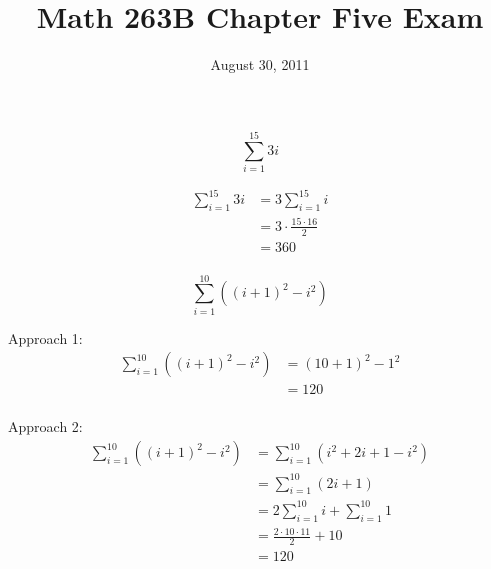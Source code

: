 \documentclass[fleqn,addpoints]{exam}
\title{Math 263B Chapter Five Exam}
\date{August 30, 2011}
\begin{document}
\maketitle  

\ifprintanswers
\else
\vspace{0.2in}
\vspace{0.2in}

\begin{center}
\gradetable[h][pages]
\bonusgradetable[h][pages]
\end{center}

\pagebreak

\fi

\begin{questions}

\question[5]
\[
  \sum_{i = 1}^{15} 3i
\]

\begin{solution}[4 cm]
\begin{align*}
  \sum_{i = 1}^{15} 3i &= 3 \sum_{i = 1}^{15} i \\
  &= 3 \cdot \frac{15 \cdot 16}{2} \\
  &= 360 \\
\end{align*}

\end{solution}

\question[7]
\[
\sum_{i = 1}^{10} \left( (i+1)^2 - i^2 \right)
\]

\begin{solution}[4 cm]
Approach 1:
\begin{align*}
  \sum_{i = 1}^{10} \left( (i+1)^2 - i^2 \right) &= (10 + 1)^2 - 1^2 \\
  &= 120 \\
\end{align*}

Approach 2:
\begin{align*}
  \sum_{i = 1}^{10} \left( (i+1)^2 - i^2 \right) &= \sum_{i = 1}^{10} \left( i^2 + 2i + 1 - i^2 \right) \\
  &= \sum_{i = 1}^{10} \left( 2i + 1 \right) \\
  &= 2 \sum_{i = 1}^{10} i +  \sum_{i = 1}^{10} 1 \\
  &= \frac{2 \cdot 10 \cdot 11}{2} + 10 \\
  &= 120 \\
\end{align*}


\end{solution}
\end{questions}
\end{document}
